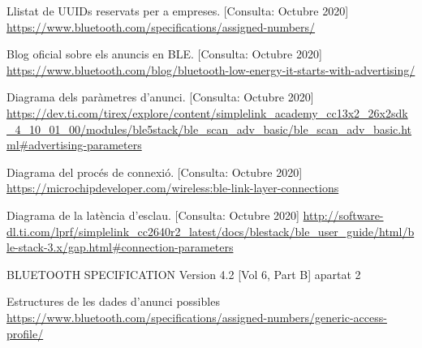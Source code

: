 \begin{thebibliography}{2}
Llistat de UUIDs reservats per a empreses.
[Consulta: Octubre 2020]\newline
\href{https://www.bluetooth.com/specifications/assigned-numbers/}{https://www.bluetooth.com/specifications/assigned-numbers/}

Blog oficial sobre els anuncis en BLE. [Consulta: Octubre 2020]\newline
\href{https://www.bluetooth.com/blog/bluetooth-low-energy-it-starts-with-advertising/}{ https://www.bluetooth.com/blog/bluetooth-low-energy-it-starts-with-advertising/}

Diagrama dels paràmetres d'anunci.
[Consulta: Octubre 2020] \newline
\href{https://dev.ti.com/tirex/explore/content/simplelink\_academy\_cc13x2\_26x2sdk\_4\_10\_01\_00/modules/ble5stack/ble\_scan\_adv\_basic/ble\_scan\_adv\_basic.html\#advertising-parameter}{https://dev.ti.com/tirex/explore/content/simplelink\_academy\_cc13x2\_26x2sdk\_4\_10\_01\_00/modules/ble5stack/ble\_scan\_adv\_basic/ble\_scan\_adv\_basic.html\#advertising-parameters}

Diagrama del procés de connexió.
[Consulta: Octubre 2020] \newline
\href{https://microchipdeveloper.com/wireless:ble-link-layer-connections}{https://microchipdeveloper.com/wireless:ble-link-layer-connections}

Diagrama de la latència d'esclau.
[Consulta: Octubre 2020] \newline
\href{http://software-dl.ti.com/lprf/simplelink\_cc2640r2\_latest/docs/blestack/ble\_user\_guide/html/ble-stack-3.x/gap.html\#connection-parameters}{http://software-dl.ti.com/lprf/simplelink\_cc2640r2\_latest/docs/blestack/ble\_user\_guide/html/ble-stack-3.x/gap.html\#connection-parameters}

BLUETOOTH SPECIFICATION Version 4.2 [Vol 6, Part B] apartat 2 

Estructures de les dades d'anunci possibles \newline
\href{https://www.bluetooth.com/specifications/assigned-numbers/generic-access-profile/}{https://www.bluetooth.com/specifications/assigned-numbers/generic-access-profile/}


\end{thebibliography}
